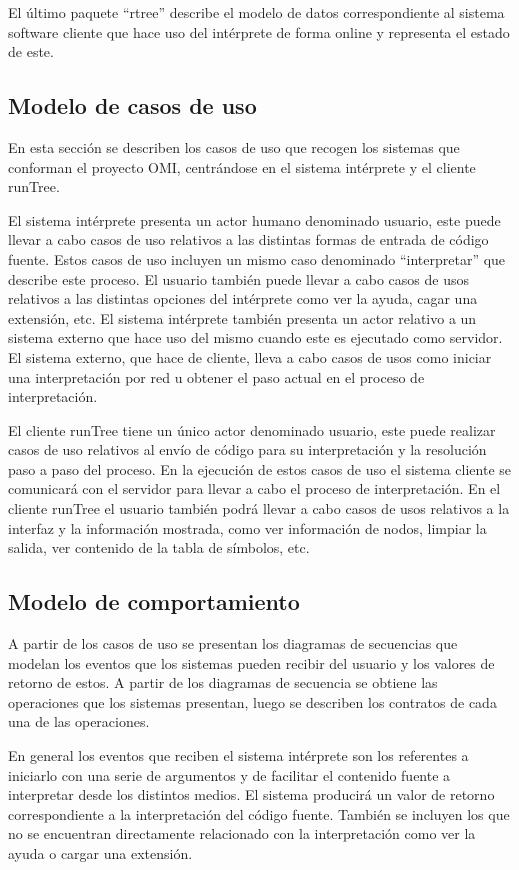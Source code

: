El último paquete ``rtree'' describe el modelo de datos correspondiente al sistema 
software cliente que hace uso del intérprete de forma online
y representa el estado de este.
 
\subsection {Modelo de casos de uso}
En esta sección se describen los casos de uso que recogen los sistemas que conforman el proyecto OMI, centrándose en el 
sistema intérprete y el cliente runTree.  

El sistema intérprete presenta un actor humano denominado usuario, este puede llevar a cabo casos de uso relativos 
a las distintas formas de entrada de código fuente. Estos casos de uso incluyen un mismo caso denominado ``interpretar'' que describe 
este proceso. El usuario también puede llevar a cabo casos de usos relativos a las distintas opciones del intérprete como ver la ayuda, cagar una extensión, etc.
El sistema intérprete también presenta un actor relativo a un sistema externo que hace uso del mismo cuando este es ejecutado como servidor. El sistema externo,
que hace de cliente, lleva a cabo casos de usos como iniciar una interpretación por red u obtener el paso actual en el proceso de interpretación.

El cliente runTree tiene un único actor denominado usuario, este puede realizar casos de uso relativos al envío de código para su interpretación y la resolución paso a paso del 
proceso. En la ejecución de estos casos de uso el sistema cliente se comunicará con el servidor para llevar a cabo el proceso de interpretación. En el cliente runTree el usuario también podrá llevar 
a cabo casos de usos relativos a la interfaz y la información mostrada, como ver información de nodos, limpiar la salida, ver contenido de la tabla de símbolos, etc. 

\subsection{Modelo de comportamiento}
A partir de los casos de uso se presentan los diagramas de secuencias que modelan los eventos que los sistemas pueden recibir del usuario y los valores de retorno de estos. A partir de los diagramas
de secuencia se obtiene las operaciones que los sistemas presentan, luego se describen los contratos de cada una de las operaciones. 

En general los eventos que reciben el sistema intérprete son los referentes a iniciarlo con una serie de argumentos y de facilitar el contenido fuente a interpretar desde los distintos medios. 
El sistema producirá un valor de retorno correspondiente a la interpretación del código fuente.  También se incluyen los que no se encuentran directamente relacionado con la interpretación como
ver la ayuda o cargar una extensión.

